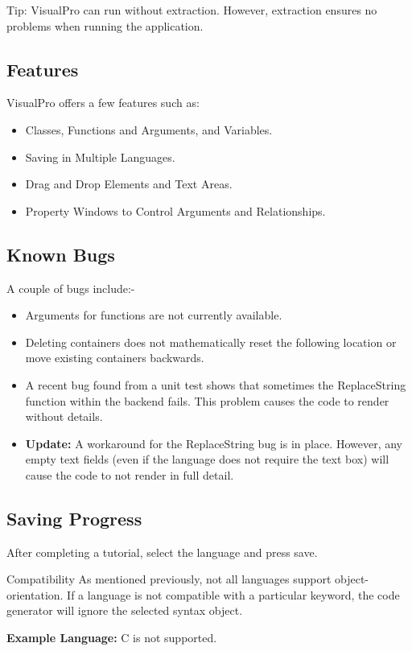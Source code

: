 \documentclass[10pt]{article}
\begin{document}
        \begin{tip}{Tip:}
            VisualPro can run without extraction. However, extraction ensures no problems when running the application.
        \end{tip}
    \subsection{Features}
        VisualPro offers a few features such as:
        \begin{itemize}
            \item Classes, Functions and Arguments, and Variables.
            \item Saving in Multiple Languages.
            \item Drag and Drop Elements and Text Areas.
            \item Property Windows to Control Arguments and Relationships.
        \end{itemize}

    \subsection{Known Bugs}
    \label{subsec:ve-knownbugs}
        A couple of bugs include:-
        \begin{itemize}
            \item Arguments for functions are not currently available.
            \item Deleting containers does not mathematically reset the following location or move existing containers backwards.
            \item A recent bug found from a unit test shows that sometimes the ReplaceString function within the backend fails. This problem causes the code to render without details. 
            \item \textbf{Update:} A workaround for the ReplaceString bug is in place. However, any empty text fields (even if the language does not require the text box) will cause the code to not render in full detail.
        \end{itemize}

    \subsection{Saving Progress}
        After completing a tutorial, select the language and press save.

        \begin{tip}{Compatibility}
            As mentioned previously, not all languages support object-orientation. If a language is not compatible with a particular keyword, the code generator will ignore the selected syntax object.

            \textbf{Example Language:} C is not supported.
        \end{tip}
\end{document}

